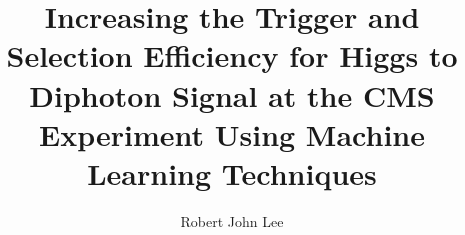 \documentclass[12pt]{ucsddissertation}
\title{Increasing the Trigger and Selection Efficiency for Higgs to Diphoton Signal at the CMS Experiment Using Machine Learning Techniques}
\author{Robert John Lee}
\begin{document}
\frontmatter
\maketitle
\makecopyright
\makesignature









\tableofcontents
\listoffigures
\listoftables


\end{document}
